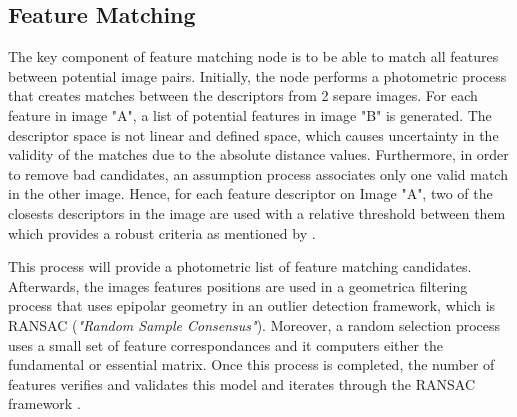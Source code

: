 \documentclass[12pt]{report}
\begin{document}
\subsection{Feature Matching}
The key component of feature matching node is to be able to match all features between potential image pairs.
Initially, the node performs a photometric process that creates matches between the descriptors from 2 separe images. For each feature in image "A", a list of potential features in image "B" is generated.
The descriptor space is not linear and defined space, which causes uncertainty in the validity of the matches due to the absolute distance values. 
Furthermore, in order to remove bad candidates, an assumption process associates only one valid match in the other image.
Hence, for each feature descriptor on Image "A", two of the closests descriptors in the image are used with a relative threshold between them which provides a robust criteria as mentioned by .

This process will provide a photometric list of feature matching candidates. Afterwards, the images features positions are used in a geometrica
filtering process that uses epipolar geometry in an outlier detection framework, which is RANSAC (\textit{"Random Sample Consensus"}).
Moreover, a random selection process uses a small set of feature correspondances and it computers either the fundamental or essential matrix. 
Once this process is completed, the number of features verifies and validates this model and iterates through the RANSAC framework .
\end{document}
